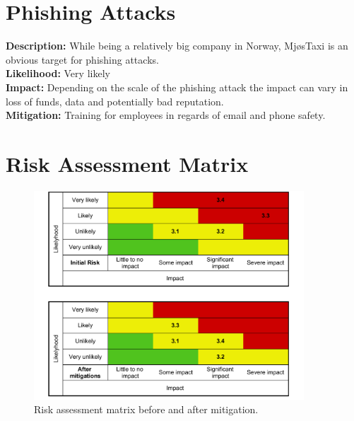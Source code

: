 \section{Phishing Attacks}
\textbf{Description:} While being a relatively big company in Norway, MjøsTaxi is an obvious target for phishing attacks.  \\
\textbf{Likelihood:} Very likely\\
\textbf{Impact:} Depending on the scale of the phishing attack the impact can vary in loss of funds, data and potentially bad reputation.\\
\textbf{Mitigation:} Training for employees in regards of email and phone safety.

\section{Risk Assessment Matrix}
\begin{figure}[h]
\centering
\includegraphics[width=0.9\textwidth]{fig/riskMatrix.pdf}
\caption{\label{fig:RiskMatrix}Risk assessment matrix before and after mitigation.}
\end{figure}

